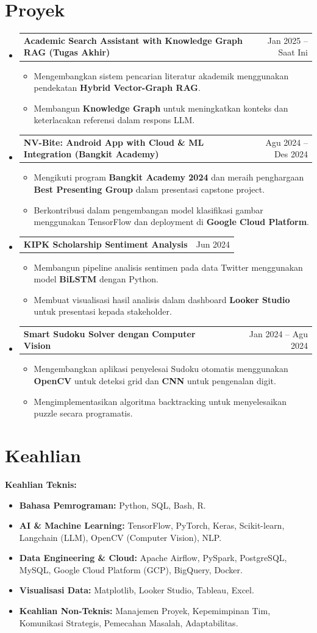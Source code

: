 \documentclass[10pt,a4paper]{article}
\makeatletter
\newcommand{\resumeItem}[1]{
  \item\small{
    {#1 \vspace{-2pt}}
  }
}
\newcommand{\resumeProjectHeading}[2]{
    \vspace{2pt}\item
    \begin{tabular*}{0.97\textwidth}{l@{\extracolsep{\fill}}r}
      \textbf{#1} & #2 \\
    \end{tabular*}\vspace{-4pt}
}
\newcommand{\resumeSubHeadingListStart}{\begin{itemize}[leftmargin=0.0in, label={}]} %
\newcommand{\resumeSubHeadingListEnd}{\end{itemize}}
\newcommand{\resumeItemListStart}{\begin{itemize}[leftmargin=0.2in]} %
\newcommand{\resumeItemListEnd}{\end{itemize}\vspace{-4pt}}
\makeatother
\begin{document}
\section{Proyek}
\resumeSubHeadingListStart
\resumeProjectHeading
{\textbf{Academic Search Assistant with Knowledge Graph RAG (Tugas Akhir)}}{Jan 2025 -- Saat Ini}
\resumeItemListStart
\resumeItem{Mengembangkan sistem pencarian literatur akademik menggunakan pendekatan \textbf{Hybrid Vector-Graph RAG}.}
\resumeItem{Membangun \textbf{Knowledge Graph} untuk meningkatkan konteks dan keterlacakan referensi dalam respons LLM.}
\resumeItemListEnd
\resumeProjectHeading
{\textbf{NV-Bite: Android App with Cloud \& ML Integration (Bangkit Academy)}}{Agu 2024 -- Des 2024}
\resumeItemListStart
\resumeItem{Mengikuti program \textbf{Bangkit Academy 2024} dan meraih penghargaan \textbf{Best Presenting Group} dalam presentasi capstone project.}
\resumeItem{Berkontribusi dalam pengembangan model klasifikasi gambar menggunakan TensorFlow dan deployment di \textbf{Google Cloud Platform}.}
\resumeItemListEnd
\resumeProjectHeading
{\textbf{KIPK Scholarship Sentiment Analysis}}{Jun 2024}
\resumeItemListStart
\resumeItem{Membangun pipeline analisis sentimen pada data Twitter menggunakan model \textbf{BiLSTM} dengan Python.}
\resumeItem{Membuat visualisasi hasil analisis dalam dashboard \textbf{Looker Studio} untuk presentasi kepada stakeholder.}
\resumeItemListEnd
\resumeProjectHeading
{\textbf{Smart Sudoku Solver dengan Computer Vision}}{Jan 2024 -- Agu 2024}
\resumeItemListStart
\resumeItem{Mengembangkan aplikasi penyelesai Sudoku otomatis menggunakan \textbf{OpenCV} untuk deteksi grid dan \textbf{CNN} untuk pengenalan digit.}
\resumeItem{Mengimplementasikan algoritma backtracking untuk menyelesaikan puzzle secara programatis.}
\resumeItemListEnd
\resumeSubHeadingListEnd

\section{Keahlian}
\textbf{Keahlian Teknis:}
\begin{itemize}[leftmargin=0.2in, itemsep=-2pt, topsep=0pt]
    \small\item \textbf{Bahasa Pemrograman:} Python, SQL, Bash, R.
    \item \textbf{AI \& Machine Learning:} TensorFlow, PyTorch, Keras, Scikit-learn, Langchain (LLM), OpenCV (Computer Vision), NLP.
    \item \textbf{Data Engineering \& Cloud:} Apache Airflow, PySpark, PostgreSQL, MySQL, Google Cloud Platform (GCP), BigQuery, Docker.
    \item \textbf{Visualisasi Data:} Matplotlib, Looker Studio, Tableau, Excel.
    \item \textbf{Keahlian Non-Teknis:} Manajemen Proyek, Kepemimpinan Tim, Komunikasi Strategis, Pemecahan Masalah, Adaptabilitas.
\end{itemize}
\vspace{2pt} %
\end{document}
